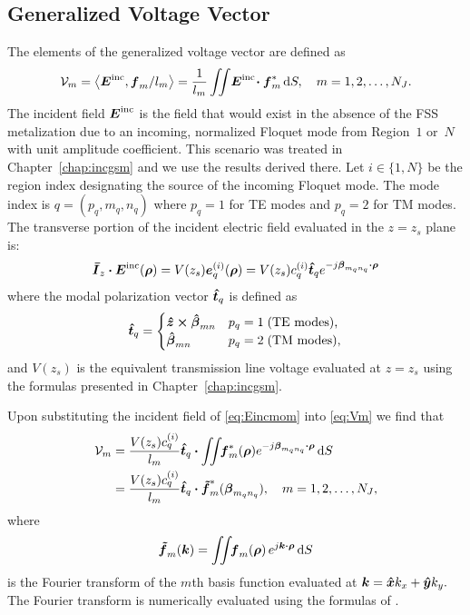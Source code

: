 \subsection{\label{subsec:gvm}Generalized Voltage Vector}
The elements of the generalized voltage vector are defined as 
\begin{equation}
 \mathcal{V}_m =  \left< \boldsymbol{E}^{\text{inc}}, \boldsymbol{f}_m/l_m \right> = \frac{1}{l_m} 
 \iint \! \boldsymbol{E}^{\text{inc}} \! \boldsymbol{\cdot} \boldsymbol{f}_m^* \, \text{d} S, \quad
      m = 1, 2, \ldots,  N_J.  \label{eq:Vm}
\end{equation}
The incident field $\boldsymbol{E}^{\text{inc}}$ is the field that would exist in the
absence of the FSS metalization due to an incoming, normalized
Floquet mode from Region~$1$ or~$N$ with unit amplitude coefficient.
This scenario was treated in Chapter~\ref{chap:incgsm} and we use the results
derived there.  Let $i \in \{1,N\}$ be the region index designating
the source of the incoming Floquet mode.  The mode index is $q =
(p_q,m_q,n_q)$ where $p_q=1$ for TE modes and $p_q=2$ for TM modes.  The
transverse portion of the incident electric field evaluated in the
$z=z_s$ plane is:
\begin{equation}
  \boldsymbol{\bar{I}}_z \boldsymbol{\cdot} \boldsymbol{E}^{\text{inc}}(\boldsymbol{\rho}) = V(z_s) \boldsymbol{e}_q^{(i)}(\boldsymbol{\rho})
  = V(z_s) c_q^{(i)} \boldsymbol{\hat{t}}_q e^{-j\boldsymbol{\beta}_{m_q n_q} \boldsymbol{\cdot}
  \boldsymbol{\rho}} \label{eq:Eincmom}
\end{equation}
where the modal polarization vector $\boldsymbol{\hat{t}}_q$ is defined as
\begin{equation}
  \label{eq:tdef}
  \boldsymbol{\hat{t}}_q = 
  \begin{cases}
    \boldsymbol{\hat{z}}\boldsymbol{\times}\boldsymbol{\hat{\beta}}_{mn} & p_q = 1 \; \text{(TE modes),} \\
    \boldsymbol{\hat{\beta}}_{mn}  & p_q = 2 \; \text{(TM modes),}
  \end{cases}
\end{equation}
and $V(z_s)$ is the equivalent transmission line voltage evaluated at
$z=z_s$ using the formulas presented in Chapter~\ref{chap:incgsm}.

Upon substituting the incident field of \eqref{eq:Eincmom} into
\eqref{eq:Vm} we find that
\begin{align}
  \mathcal{V}_m &=  
  \frac{V(z_s) c_q^{(i)}}{l_m}   \boldsymbol{\hat{t}}_q \boldsymbol{\cdot} 
  \iint \! \! \boldsymbol{f}_m^*(\boldsymbol{\rho}) e^{-j\boldsymbol{\beta}_{m_q n_q}\boldsymbol{\cdot}\boldsymbol{\rho}} \, \text{d} S 
  \nonumber \\
  &= 
  \frac{V(z_s) c_q^{(i)}}{l_m}   \boldsymbol{\hat{t}}_q \boldsymbol{\cdot} 
  \boldsymbol{\tilde{f}}_m^*(\boldsymbol{\beta}_{m_q n_q}), \quad
  m = 1, 2, \ldots,  N_J,  
\end{align}
where
\begin{equation}
    \boldsymbol{\tilde{f}}_m(\boldsymbol{k}) = \iint \!\!
    \boldsymbol{f}_m(\boldsymbol{\rho}) \, e^{j\boldsymbol{k} \boldsymbol{\cdot} \boldsymbol{\rho}} \, \text{d} S 
\end{equation}
is the Fourier transform of the $m$th basis function evaluated at $\boldsymbol{k}
= \boldsymbol{\hat{x}} k_x + \boldsymbol{\hat{y}} k_y.$  The Fourier transform is numerically
evaluated using the formulas of \cite{mcsi:91}.



